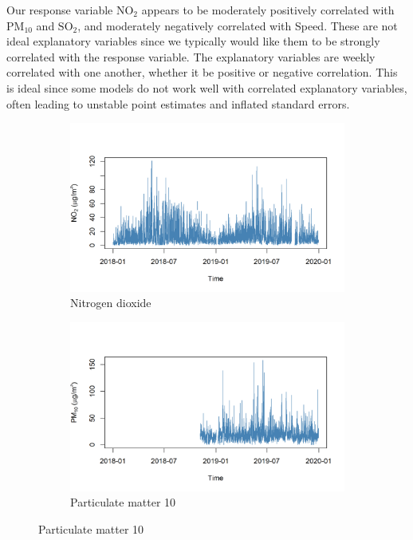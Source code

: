          Our response variable $\text{NO}_{2}$ appears to be moderately positively correlated with $\text{PM}_{10}$ and $\text{SO}_{2}$, and moderately negatively correlated with Speed. These are not ideal explanatory variables since we typically would like them to be strongly correlated with the response variable. The explanatory variables are weekly correlated with one another, whether it be positive or negative correlation. This is ideal since some models do not work well with correlated explanatory variables, often leading to unstable point estimates and inflated standard errors.

         \begin{figure}[H]
            \centering
            \begin{subfigure}{0.48\linewidth}
               \centering
               \includegraphics[width=\linewidth]{../images/extracted_no2.png}
            \caption{Nitrogen dioxide}
            \end{subfigure}
            \hfill
            \begin{subfigure}{0.48\linewidth}
               \centering
               \includegraphics[width=\linewidth]{../images/extracted_pm10.png}
               \caption{Particulate matter 10}
            \end{subfigure}
            

\end{figure}
